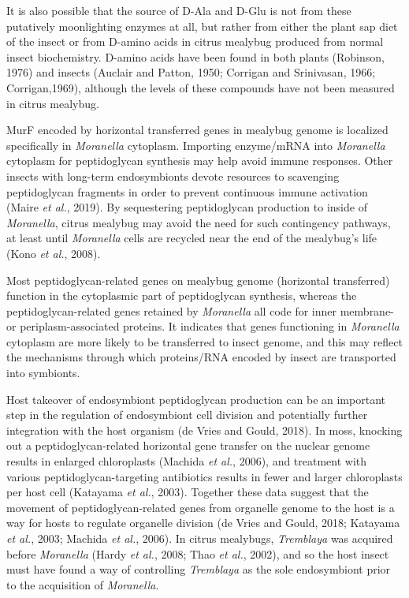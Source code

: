 \documentclass[11pt]{article}
\begin{document}
\begin{sloppypar}
It is also possible that the source of D-Ala and D-Glu is not from these putatively moonlighting enzymes at all, but rather from either the plant sap diet of the insect or from D-amino acids in citrus mealybug produced from normal insect
biochemistry. 
D-amino acids have been found in both plants (Robinson, 1976) and insects (Auclair and Patton, 1950; Corrigan and Srinivasan, 1966; Corrigan,1969), although the levels of these compounds have not been measured in citrus mealybug. 
\par
MurF encoded by horizontal transferred genes in mealybug genome is localized specifically in \textit{Moranella} cytoplasm. 
Importing enzyme/mRNA into \textit{Moranella} cytoplasm for peptidoglycan synthesis may help avoid immune responses. 
Other insects with long-term endosymbionts devote resources to scavenging peptidoglycan fragments in order to prevent continuous immune activation (Maire \textit{et al.}, 2019). 
By sequestering peptidoglycan production to inside of \textit{Moranella}, citrus mealybug may avoid the need for such contingency pathways, at least until \textit{Moranella} cells are recycled near the end of the mealybug’s life (Kono \textit{et al.}, 2008).
\par
Most peptidoglycan-related genes on mealybug genome (horizontal transferred) function in the cytoplasmic part of peptidoglycan synthesis, whereas the peptidoglycan-related genes retained by \textit{Moranella} all code for inner membrane- or periplasm-associated proteins. 
It indicates that genes functioning in \textit{Moranella} cytoplasm are more likely to be transferred to insect genome, and this may reflect the mechanisms through which proteins/RNA encoded by insect are transported into symbionts. 
\par
Host takeover of endosymbiont peptidoglycan production can be an important step in the regulation of endosymbiont cell division and potentially further integration with the host organism (de Vries and Gould, 2018). 
In moss, knocking out a peptidoglycan-related horizontal gene transfer on the nuclear genome results in enlarged chloroplasts
(Machida \textit{et al.}, 2006), and treatment with various peptidoglycan-targeting antibiotics results in fewer and larger chloroplasts per host cell (Katayama \textit{et al.}, 2003). 
Together these data suggest that the movement of peptidoglycan-related genes from organelle genome to the host is a way for hosts to regulate organelle division (de Vries and Gould, 2018; Katayama \textit{et al.}, 2003; Machida \textit{et al.}, 2006). 
In citrus mealybugs, \textit{Tremblaya} was acquired before \textit{Moranella} (Hardy \textit{et al.}, 2008; Thao \textit{et al.}, 2002), and so the host insect must have found a way of controlling \textit{Tremblaya} as the sole endosymbiont prior to the acquisition of \textit{Moranella}. 

\end{sloppypar}
\end{document}
